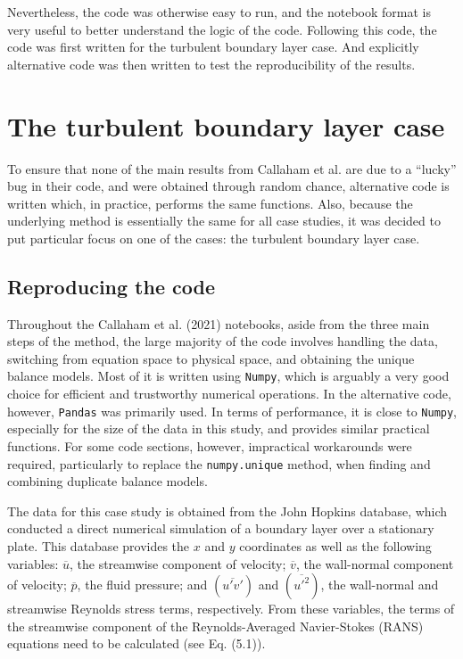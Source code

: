 \documentclass[12pt]{report} %
\begin{document}
\vspace{5mm}

Nevertheless, the code was otherwise easy to run, and the notebook format is very useful to better understand the logic of the code. Following this code, the code was first written for the turbulent boundary layer case. And explicitly alternative code was then written to test the reproducibility of the results.

\section{The turbulent boundary layer case}

To ensure that none of the main results from Callaham et al. are due to a “lucky” bug in their code, and were obtained through random chance, alternative code is written which, in practice, performs the same functions. Also, because the underlying method is essentially the same for all case studies, it was decided to put particular focus on one of the cases: the turbulent boundary layer case.

\subsection{Reproducing the code}

Throughout the Callaham et al. (2021)\cite{callaham2021learning} notebooks, aside from the three main steps of the method, the large majority of the code involves handling the data, switching from equation space to physical space, and obtaining the unique balance models. Most of it is written using \texttt{Numpy}, which is arguably a very good choice for efficient and trustworthy numerical operations. In the alternative code, however, \texttt{Pandas} was primarily used. In terms of performance, it is close to \texttt{Numpy}, especially for the size of the data in this study, and provides similar practical functions. For some code sections, however, impractical workarounds were required, particularly to replace the \texttt{numpy.unique} method, when finding and combining duplicate balance models.

\vspace{5mm}

The data for this case study is obtained from the John Hopkins database, which conducted a direct numerical simulation of a boundary layer over a stationary plate\cite{jhtdb}. This database provides the $x$ and $y$ coordinates as well as the following variables: $\overline{u}$, the streamwise component of velocity;  $\overline{v}$, the wall-normal component of velocity;  $\overline{p}$, the fluid pressure; and $(\overline{u{\prime} v{\prime}})$ and $(\overline{u{\prime}^2})$, the wall-normal and streamwise Reynolds stress terms, respectively. From these variables, the terms of the streamwise component of the Reynolds-Averaged Navier-Stokes (RANS) equations need to be calculated (see Eq. (5.1)).
\end{document}
